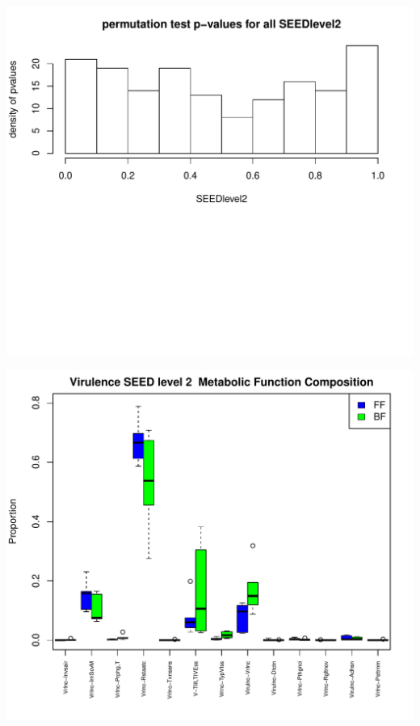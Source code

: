 \documentclass{article}\usepackage[]{graphicx}\usepackage[]{color}
\makeatletter
\def\maxwidth{ %
  \ifdim\Gin@nat@width>\linewidth
    \linewidth
  \else
    \Gin@nat@width
  \fi
}
\makeatother
\begin{document}
\begin{Schunk}
{\centering \includegraphics[width=\maxwidth]{figure/Oct_15_1-3} 

}



{\centering \includegraphics[width=\maxwidth]{figure/Oct_15_1-4} 

}




\end{Schunk}
\end{document}
